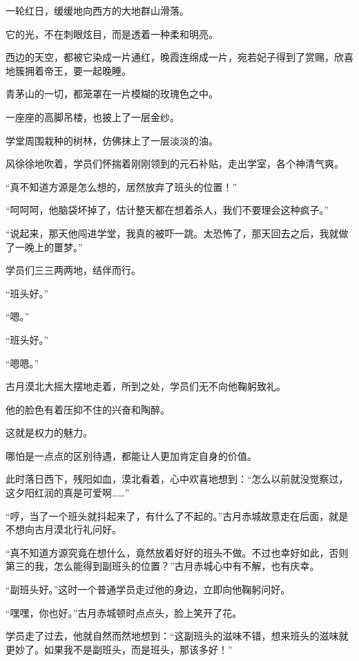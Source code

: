
\begin{this_body}



一轮红日，缓缓地向西方的大地群山滑落。

它的光，不在刺眼炫目，而是透着一种柔和明亮。

西边的天空，都被它染成一片通红，晚霞连绵成一片，宛若妃子得到了赏赐，欣喜地簇拥着帝王，要一起晚睡。

青茅山的一切，都笼罩在一片模糊的玫瑰色之中。

一座座的高脚吊楼，也披上了一层金纱。

学堂周围栽种的树林，仿佛抹上了一层淡淡的油。

风徐徐地吹着，学员们怀揣着刚刚领到的元石补贴，走出学室，各个神清气爽。

“真不知道方源是怎么想的，居然放弃了班头的位置！”

“呵呵呵，他脑袋坏掉了，估计整天都在想着杀人，我们不要理会这种疯子。”

“说起来，那天他闯进学堂，我真的被吓一跳。太恐怖了，那天回去之后，我就做了一晚上的噩梦。”

学员们三三两两地，结伴而行。

“班头好。”

“嗯。”

“班头好。”

“嗯嗯。”

古月漠北大摇大摆地走着，所到之处，学员们无不向他鞠躬致礼。

他的脸色有着压抑不住的兴奋和陶醉。

这就是权力的魅力。

哪怕是一点点的区别待遇，都能让人更加肯定自身的价值。

此时落日西下，残阳如血，漠北看着，心中欢喜地想到：“怎么以前就没觉察过，这夕阳红润的真是可爱啊……”

“哼，当了一个班头就抖起来了，有什么了不起的。”古月赤城故意走在后面，就是不想向古月漠北行礼问好。

“真不知道方源究竟在想什么，竟然放着好好的班头不做。不过也幸好如此，否则第三的我，怎么能得到副班头的位置？”古月赤城心中有不解，也有庆幸。

“副班头好。”这时一个普通学员走过他的身边，立即向他鞠躬问好。

“嘿嘿，你也好。”古月赤城顿时点点头，脸上笑开了花。

学员走了过去，他就自然而然地想到：“这副班头的滋味不错，想来班头的滋味就更妙了。如果我不是副班头，而是班头，那该多好！”


\end{this_body}
